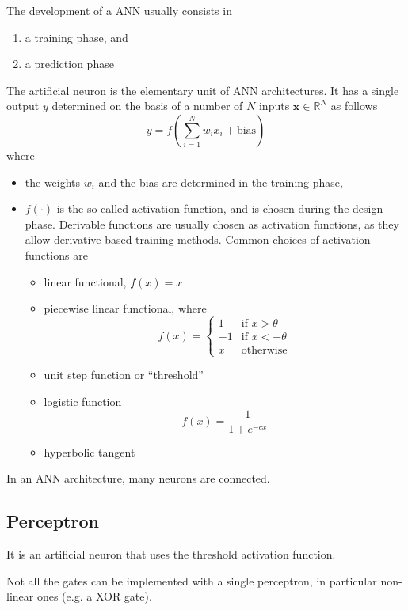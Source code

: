 \documentclass[oneside,onecolumn]{report}
\begin{document}
The development of a ANN usually consists in
\begin{enumerate}
    \item a training phase, and
    \item a prediction phase
\end{enumerate}

The artificial neuron is the elementary unit of ANN architectures.
It has a single output $y$ determined on the basis of a number of $N$ inputs $\bm x \in \mathbb R^N$ as follows
$$ y = f\left( \sum_{i = 1}^N w_i x_i + \text{bias} \right) $$
where
\begin{itemize}
    \item the weights $w_i$ and the bias are determined in the training phase,
    \item $f(\cdot)$ is the so-called activation function, and is chosen during the design phase.
    Derivable functions are usually chosen as activation functions, as they allow derivative-based training methods.
    Common choices of activation functions are
    \begin{itemize}
        \item linear functional, $f(x) = x$
        \item piecewise linear functional, where
        $$ f(x) = \begin{cases}
            1 & \text{if } x > \theta \\
            -1 & \text{if } x < -\theta \\
            x & \text{otherwise}
        \end{cases} $$
        \item unit step function or ``threshold''
        \item logistic function
        $$ f(x) = \frac{1}{1 + e^{-c x}} $$
        \item hyperbolic tangent
    \end{itemize}
\end{itemize}

In an ANN architecture, many neurons are connected.


\subsection{Perceptron}
It is an artificial neuron that uses the threshold activation function.

Not all the gates can be implemented with a single perceptron, in particular non-linear ones (e.g. a XOR gate).
\end{document}
